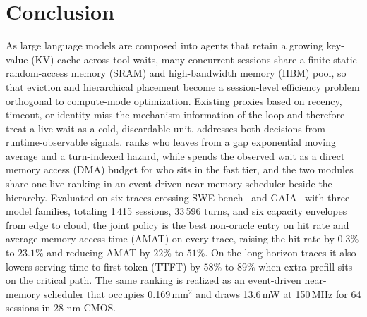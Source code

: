 \section{Conclusion}
\label{sec:conc}

As large language models are composed into agents that retain a
growing key-value (KV) cache across tool waits, many concurrent
sessions share a finite static random-access memory (SRAM) and
high-bandwidth memory (HBM) pool, so that eviction and hierarchical
placement become a session-level efficiency problem orthogonal to
compute-mode optimization. Existing proxies based on recency,
timeout, or identity miss the mechanism information of the loop and
therefore treat a live wait as a cold, discardable unit.
\unison addresses both decisions from runtime-observable signals.
\spear ranks who leaves from a gap exponential moving average and a
turn-indexed hazard, while \tide spends the observed wait as a
direct memory access (DMA) budget for who sits in the fast tier, and
the two modules share one live ranking in an event-driven
near-memory scheduler beside the hierarchy.
Evaluated on six traces crossing
SWE-bench~\cite{jimenez_swebench_2024} and
GAIA~\cite{mialon_gaia_2023} with three model
families, totaling 1\,415 sessions, 33\,596 turns, and six capacity
envelopes from edge to cloud, the joint policy is the best
non-oracle entry on hit rate and average memory access time (AMAT)
on every trace, raising the hit rate by $0.3\%$ to $23.1\%$ and
reducing AMAT by $22\%$ to $51\%$. On the long-horizon traces it
also lowers serving time to first token (TTFT) by $58\%$ to $89\%$
when extra prefill sits on the critical path. The same ranking is realized as an event-driven near-memory
scheduler that occupies 0.169\,mm$^{2}$ and draws 13.6\,mW at
150\,MHz for 64 sessions in 28-nm CMOS.
